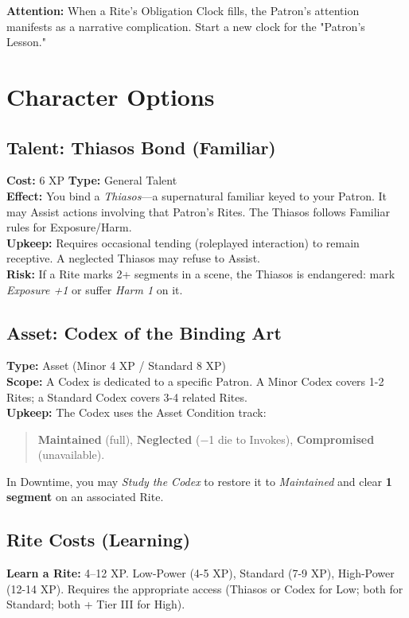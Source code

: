 \documentclass[12pt,twoside]{book}
\begin{document}
\textbf{Attention:} When a Rite's Obligation Clock fills, the Patron's attention manifests as a narrative complication. Start a new clock for the "Patron's Lesson."

\section{Character Options}
\subsection{Talent: Thiasos Bond (Familiar)}
\label{subsec:thiasos-bond}
\textbf{Cost:} 6 XP \hfill \textbf{Type:} General Talent \\
\textbf{Effect:} You bind a \emph{Thiasos}---a supernatural familiar keyed to your Patron. It may Assist actions involving that Patron's Rites. The Thiasos follows Familiar rules for Exposure/Harm.\\
\textbf{Upkeep:} Requires occasional tending (roleplayed interaction) to remain receptive. A neglected Thiasos may refuse to Assist.\\
\textbf{Risk:} If a Rite marks 2+ segments in a scene, the Thiasos is endangered: mark \emph{Exposure +1} or suffer \emph{Harm 1} on it.

\subsection{Asset: Codex of the Binding Art}
\label{subsec:codex-asset}
\textbf{Type:} Asset (Minor 4 XP / Standard 8 XP) \\
\textbf{Scope:} A Codex is dedicated to a specific Patron. A Minor Codex covers 1-2 Rites; a Standard Codex covers 3-4 related Rites.\\
\textbf{Upkeep:} The Codex uses the Asset Condition track:
\begin{quote}
\textbf{Maintained} (full), \textbf{Neglected} (−1 die to Invokes), \textbf{Compromised} (unavailable).
\end{quote}
In Downtime, you may \emph{Study the Codex} to restore it to \emph{Maintained} and clear \textbf{1 segment} on an associated Rite.

\subsection{Rite Costs (Learning)}
\textbf{Learn a Rite:} 4–12 XP. Low-Power (4-5 XP), Standard (7-9 XP), High-Power (12-14 XP). Requires the appropriate access (Thiasos or Codex for Low; both for Standard; both + Tier III for High).
\end{document}
